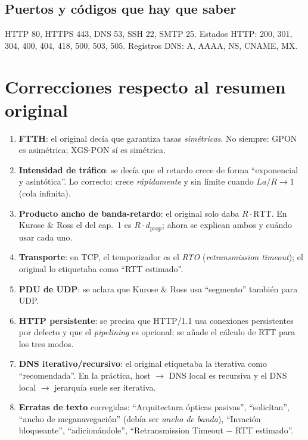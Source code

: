 \documentclass[11pt,a4paper]{article}
\begin{document}
\subsection*{Puertos y códigos que hay que saber}
HTTP 80, HTTPS 443, DNS 53, SSH 22, SMTP 25. Estados HTTP: 200, 301, 304, 400, 404, 418, 500, 503, 505. Registros DNS: A, AAAA, NS, CNAME, MX.

\section{Correcciones respecto al resumen original}

\begin{nota}
\begin{enumerate}[leftmargin=1.6em]
  \item \textbf{FTTH}: el original decía que garantiza tasas \emph{simétricas}. No siempre: GPON es asimétrica; XGS-PON sí es simétrica.
  \item \textbf{Intensidad de tráfico}: se decía que el retardo crece de forma ``exponencial y asintótica''. Lo correcto: crece \emph{rápidamente} y sin límite cuando $La/R\to1$ (cola infinita).
  \item \textbf{Producto ancho de banda-retardo}: el original solo daba $R\cdot\text{RTT}$. En Kurose \& Ross el del cap.~1 es $R\cdot d_{\text{prop}}$; ahora se explican ambos y cuándo usar cada uno.
  \item \textbf{Transporte}: en TCP, el temporizador es el \emph{RTO} (\textit{retransmission timeout}); el original lo etiquetaba como ``RTT estimado''.
  \item \textbf{PDU de UDP}: se aclara que Kurose \& Ross usa ``segmento'' también para UDP.
  \item \textbf{HTTP persistente}: se precisa que HTTP/1.1 usa conexiones persistentes por defecto y que el \emph{pipelining} es opcional; se añade el cálculo de RTT para los tres modos.
  \item \textbf{DNS iterativo/recursivo}: el original etiquetaba la iterativa como ``recomendada''. En la práctica, host $\to$ DNS local es recursiva y el DNS local $\to$ jerarquía suele ser iterativa.
  \item \textbf{Erratas de texto} corregidas: ``Arquitectura ópticas pasivas'', ``solicítan'', ``ancho de meganavegación'' (debía ser \emph{ancho de banda}), ``Invación bloqueante'', ``adicionándole'', ``Retransmission Timeout $-$ RTT estimado''.

\end{enumerate}
\end{nota}
\end{document}
